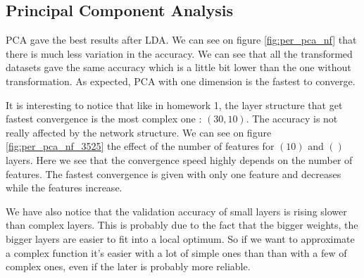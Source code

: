 \documentclass[twocolumn, 10pt]{article}
\begin{document}
		\subsection{Principal Component Analysis}
			PCA gave the best results after LDA. We can see on figure \ref{fig:per_pca_nf} that there is much less variation in the accuracy. We can see that all the transformed datasets gave the same accuracy which is a little bit lower than the one without transformation. As expected, PCA with one dimension is the fastest to converge.

			It is interesting to notice that like in homework 1, the layer structure that get fastest convergence is the most complex one : $(30, 10)$. The accuracy is not really affected by the network structure. We can see on figure \ref{fig:per_pca_nf_3525} the effect of the number of features for $(10)$ and $()$ layers. Here we see that the convergence speed highly depends on the number of features. The fastest convergence is given with only one feature and decreases while the features increase.

			We have also notice that the validation accuracy of small layers is rising slower than complex layers. This is probably due to the fact that the bigger weights, the bigger layers are easier to fit into a local optimum. So if we want to approximate a complex function it's easier with a lot of simple ones than than with a few of complex ones, even if the later is probably more reliable.
\end{document}
